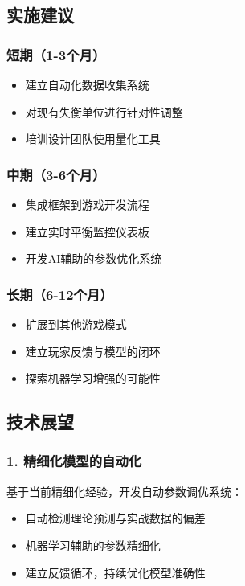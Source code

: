 \documentclass[a4paper,12pt]{article}
\begin{document}
\subsection{实施建议}

\subsubsection{短期（1-3个月）}
\begin{itemize}
\item 建立自动化数据收集系统
\item 对现有失衡单位进行针对性调整
\item 培训设计团队使用量化工具
\end{itemize}

\subsubsection{中期（3-6个月）}
\begin{itemize}
\item 集成框架到游戏开发流程
\item 建立实时平衡监控仪表板
\item 开发AI辅助的参数优化系统
\end{itemize}

\subsubsection{长期（6-12个月）}
\begin{itemize}
\item 扩展到其他游戏模式
\item 建立玩家反馈与模型的闭环
\item 探索机器学习增强的可能性
\end{itemize}

\subsection{技术展望}

\subsubsection{1. 精细化模型的自动化}
基于当前精细化经验，开发自动参数调优系统：
\begin{itemize}
\item 自动检测理论预测与实战数据的偏差
\item 机器学习辅助的参数精细化
\item 建立反馈循环，持续优化模型准确性
\end{itemize}
\end{document}
